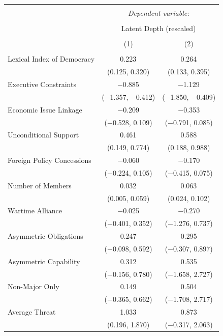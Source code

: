 \documentclass[12pt]{article}
\begin{document}
\begin{table}[!htbp] \centering  
\begin{tabular}{@{\extracolsep{5pt}}lcc} 
\\[-1.8ex]\hline 
\hline \\[-1.8ex] 
 & \multicolumn{2}{c}{\textit{Dependent variable:}} \\ 
\cline{2-3} 
\\[-1.8ex] & \multicolumn{2}{c}{Latent Depth (rescaled)} \\ 
\\[-1.8ex] & (1) & (2)\\ 
\hline \\[-1.8ex] 
 Lexical Index of Democracy & 0.223$^{}$ & 0.264$^{}$ \\ 
  & (0.125, 0.320) & (0.133, 0.395) \\ 
  Executive Constraints & $-$0.885$^{}$ & $-$1.129$^{}$ \\ 
  & ($-$1.357, $-$0.412) & ($-$1.850, $-$0.409) \\ 
  Economic Issue Linkage & $-$0.209 & $-$0.353 \\ 
  & ($-$0.528, 0.109) & ($-$0.791, 0.085) \\ 
  Unconditional Support & 0.461$^{}$ & 0.588$^{}$ \\ 
  & (0.149, 0.774) & (0.188, 0.988) \\ 
  Foreign Policy Concessions & $-$0.060 & $-$0.170 \\ 
  & ($-$0.224, 0.105) & ($-$0.415, 0.075) \\ 
  Number of Members & 0.032$^{}$ & 0.063$^{}$ \\ 
  & (0.005, 0.059) & (0.024, 0.102) \\ 
  Wartime Alliance & $-$0.025 & $-$0.270 \\ 
  & ($-$0.401, 0.352) & ($-$1.276, 0.737) \\ 
  Asymmetric Obligations & 0.247 & 0.295 \\ 
  & ($-$0.098, 0.592) & ($-$0.307, 0.897) \\ 
  Asymmetric Capability & 0.312 & 0.535 \\ 
  & ($-$0.156, 0.780) & ($-$1.658, 2.727) \\ 
  Non-Major Only & 0.149 & 0.504 \\ 
  & ($-$0.365, 0.662) & ($-$1.708, 2.717) \\ 
  Average Threat & 1.033$^{}$ & 0.873 \\ 
  & (0.196, 1.870) & ($-$0.317, 2.063) \\ 

\end{tabular}
\end{table}
\end{document}

